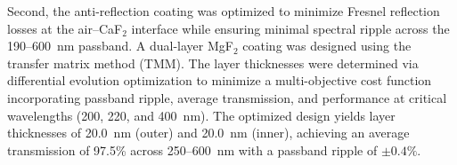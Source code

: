 \documentclass{aastex701}
\begin{document}
Second, the anti-reflection coating was optimized to minimize Fresnel reflection losses at the air--CaF$_2$ interface while ensuring minimal spectral ripple across the 190--600~nm passband. A dual-layer MgF$_2$ coating was designed using the transfer matrix method (TMM). The layer thicknesses were determined via differential evolution optimization to minimize a multi-objective cost function incorporating passband ripple, average transmission, and performance at critical wavelengths (200, 220, and 400~nm). The optimized design yields layer thicknesses of 20.0~nm (outer) and 20.0~nm (inner), achieving an average transmission of 97.5\% across 250--600~nm with a passband ripple of $\pm 0.4\%$.
\begin{figure}[htbp]
    \centering
\end{figure}
\end{document}
